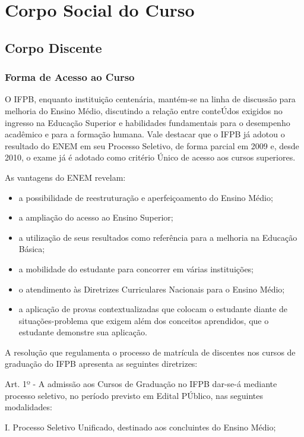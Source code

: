 \newpage
\section{Corpo Social do Curso}

\subsection{Corpo Discente}

\subsubsection{Forma de Acesso ao Curso}

	O IFPB, enquanto instituição centenária, mantém-se na linha de discussão para melhoria do Ensino Médio, discutindo a relação entre conteÚdos exigidos no ingresso na Educação Superior e habilidades fundamentais para o desempenho acadêmico e para a formação humana. Vale destacar que o IFPB já adotou o resultado do ENEM em seu Processo Seletivo, de forma parcial em 2009 e, desde 2010, o exame já é adotado como critério Único de acesso aos cursos superiores.

As vantagens do ENEM revelam:

\begin{itemize}
\item a possibilidade de reestruturação e aperfeiçoamento do Ensino Médio;
\item a ampliação do acesso ao Ensino Superior;
\item a utilização de seus resultados como referência para a melhoria na Educação Básica;
\item a mobilidade do estudante para concorrer em várias instituições;
\item o atendimento às Diretrizes Curriculares Nacionais para o Ensino Médio;
\item a aplicação de provas contextualizadas que colocam o estudante diante de situações-problema que exigem além dos conceitos aprendidos, que o estudante demonstre sua aplicação.
\end{itemize}

 A resolução que regulamenta o processo de matrícula de discentes nos cursos de graduação do IFPB apresenta as seguintes diretrizes:

Art. 1º - A admissão aos Cursos de Graduação no IFPB dar-se-á mediante processo seletivo, no período previsto em Edital PÚblico, nas seguintes modalidades:


I. Processo Seletivo Unificado, destinado aos concluintes do Ensino Médio;


